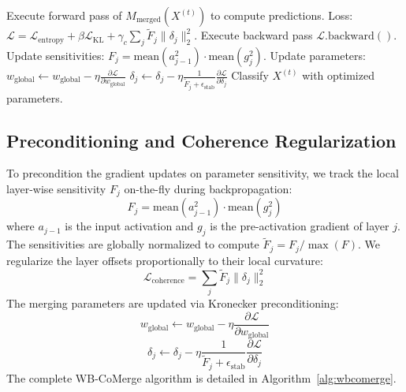 \documentclass{article}
\theoremstyle{plain}
\theoremstyle{definition}
\theoremstyle{remark}
\begin{document}
\begin{algorithm}[tb]
\begin{scriptsize}
\begin{algorithmic}[1]
    \STATE Execute forward pass of $M_{\text{merged}}(X^{(t)})$ to compute predictions.
    \STATE Loss: $\mathcal{L} = \mathcal{L}_{\text{entropy}} + \beta \mathcal{L}_{\text{KL}} + \gamma_c \sum_j \tilde{F}_j \|\delta_j\|_2^2$.
    \STATE Execute backward pass $\mathcal{L}.\text{backward}()$.
    \STATE Update sensitivities: $F_j = \text{mean}(a_{j-1}^2) \cdot \text{mean}(g_j^2)$.
    \STATE Update parameters:
    \STATE $w_{\text{global}} \leftarrow w_{\text{global}} - \eta \frac{\partial \mathcal{L}}{\partial w_{\text{global}}}$
    \STATE $\delta_j \leftarrow \delta_j - \eta \frac{1}{\tilde{F}_j + \epsilon_{\text{stab}}} \frac{\partial \mathcal{L}}{\partial \delta_j}$
    \ENDFOR
    \STATE Classify $X^{(t)}$ with optimized parameters.
    \ENDFOR
  \end{algorithmic}
  \end{scriptsize}
\end{algorithm}

\subsection{Preconditioning and Coherence Regularization}
To precondition the gradient updates on parameter sensitivity, we track the local layer-wise sensitivity $F_j$ on-the-fly during backpropagation:
\begin{equation}
  F_j = \text{mean}(a_{j-1}^2) \cdot \text{mean}(g_j^2)
\end{equation}
where $a_{j-1}$ is the input activation and $g_j$ is the pre-activation gradient of layer $j$. The sensitivities are globally normalized to compute $\tilde{F}_j = F_j / \max(F)$. We regularize the layer offsets proportionally to their local curvature:
\begin{equation}
  \mathcal{L}_{\text{coherence}} = \sum_j \tilde{F}_j \|\delta_j\|_2^2
\end{equation}
The merging parameters are updated via Kronecker preconditioning:
\begin{equation}
  w_{\text{global}} \leftarrow w_{\text{global}} - \eta \frac{\partial \mathcal{L}}{\partial w_{\text{global}}}
\end{equation}
\begin{equation}
  \delta_j \leftarrow \delta_j - \eta \frac{1}{\tilde{F}_j + \epsilon_{\text{stab}}} \frac{\partial \mathcal{L}}{\partial \delta_j}
\end{equation}
The complete WB-CoMerge algorithm is detailed in Algorithm~\ref{alg:wbcomerge}.
\end{document}

